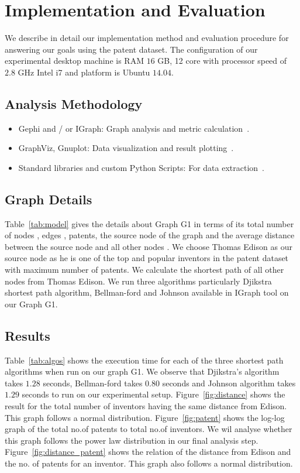 \section{Implementation and Evaluation}
We describe in detail our implementation method and evaluation procedure for answering 
our goals using the patent dataset. The configuration of our experimental desktop machine is RAM $16$ GB, 12 core with processor speed of
 $2.8$ GHz Intel i7 and platform is Ubuntu $14.04$.

\subsection{Analysis Methodology}

\begin{itemize}
\squish
\item Gephi and / or IGraph: Graph analysis and metric calculation~\cite{gephi, igraph}.

\item GraphViz, Gnuplot: Data visualization and result plotting~\cite{graphviz, gnuplot}.

\item Standard libraries and custom Python Scripts: For data extraction~\cite{python}.
\end{itemize}

\subsection{Graph Details}
Table~\ref{tab:model} gives the details about Graph G1 in
terms of its total number of nodes , edges , patents, the source node  of the graph
and the average distance between the source node and all other nodes .  
 We choose Thomas Edison as our source node
as he is one of the top and popular inventors in the patent dataset with maximum number of patents.
We calculate the shortest path of all other nodes from Thomas Edison. 
We run three algorithms particularly Djikstra shortest path algorithm, Bellman-ford and Johnson 
available in IGraph tool on our Graph G1. 

\subsection{Results}
Table~\ref{tab:algos} shows the execution time for each of the three shortest path algorithms 
when run on our graph G1. We observe that Djikstra's algorithm takes $1.28$ seconds, Bellman-ford takes
$0.80$ seconds and Johnson algorithm takes $1.29$ seconds to run on our experimental setup.
Figure~\ref{fig:distance} shows the result for the total number of inventors having the same
distance from Edison. This graph follows a normal distribution. Figure~\ref{fig:patent} shows the log-log graph of the total no.of patents
to total no.of inventors. We wil analyse whether this graph follows the power law distribution in our 
final analysis step. Figure~\ref{fig:distance_patent} shows the relation of the distance from Edison and
the no. of patents for an inventor. This graph also follows a normal distribution.



